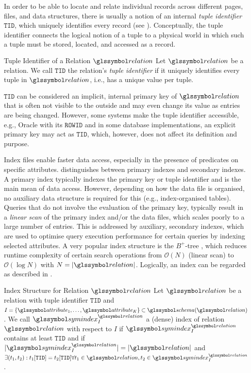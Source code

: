 In order to be able to locate and relate individual records across different pages, files, and data structures, there is usually a notion of an internal \emph{tuple identifier} $\mathtt{TID}$, which uniquely identifies every record (see ). Conceptually, the tuple identifier connects the logical notion of a tuple to a physical world in which such a tuple must be stored, located, and accessed as a record.

\begin{definition}[label=definition:tuple_identifier]{Tuple Identifier of a Relation $\relation$}{}
    Let $\relation$ be a relation. We call $\mathtt{TID}$ the relation's \emph{tuple identifier} if it uniquely identifies every tuple in $\relation$, i.e., has a unique value per tuple.
\end{definition}

$\mathtt{TID}$ can be considered an implicit, internal primary key of $\relation$ that is often not visible to the outside and may even change its value as entries are being changed. However, some systems make the tuple identifier accessible, e.g., Oracle with its $\mathtt{ROWID}$ and in some database implementations, an explicit primary key may act as $\mathtt{TID}$, which, however, does not affect its definition and purpose.

Index files enable faster data access, especially in the presence of predicates on specific attributes. \cite{Petrov:2019Database} distinguishes between primary indexes and secondary indexes. A primary index typically indexes the primary key or tuple identifier and is the main mean of data access. However, depending on how the data file is organised, no auxiliary data structure is required for this (e.g., index-organised tables). Queries that do not involve the evaluation of the primary key, typically result in a \emph{linear scan} of the primary index and/or the data files, which scales poorly to a large number of entries. This is addressed by auxiliary, secondary indexes, which are used to optimise query execution performance for certain queries by indexing selected attributes. A very popular index structure is the $B^{+}$-tree \cite{Bayer:2002Organization}, which reduces runtime complexity of certain search operations from $\mathcal{O}(N)$ (linear scan) to $\mathcal{O}(\log N)$ with $N = |\relation|$. Logically, an index can be regarded as described in .

\begin{definition}[label=definition:index]{Index Structure for Relation $\relation$}{}
    Let $\relation$ be a relation with tuple identifier $\mathtt{TID}$ and $I = \{ \attribute_{1}, \ldots, \attribute_{K} \} \subset \schema (\relation)$. We call $\symindex^{\relation}_I$ a (dense) index of relation $\relation$ with respect to $I$ if $\symindex^{\relation}_I$ contains at least $\mathtt{TID}$ and if $|\symindex^{\relation}_I| = |\relation|$ and $\exists (t_1, t_2) : t_1[\mathtt{TID}] = t_2[\mathtt{TID}] \forall t_1 \in \relation, t_2 \in \symindex^{\relation}_I$.
\end{definition}

